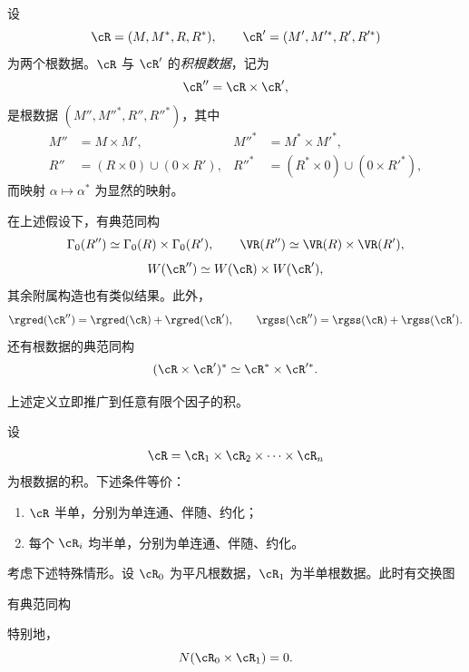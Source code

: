 \begin{definition}\label{sga3:XXI:6.4.1}
设
\[
 \cR=(M,M^\ast,R,R^\ast),
 \qquad
 \cR'=(M',M'^\ast,R',R'^\ast)
\]
为两个根数据。\(\cR\) 与 \(\cR'\) 的\emph{积根数据}，记为
\[
 \cR''=\cR\times\cR',
\]
是根数据 \((M'',M''^\ast,R'',R''^\ast)\)，其中
\[
\begin{aligned}
 M''&=M\times M',
 &M''^\ast&=M^\ast\times M'^\ast,\\
 R''&=(R\times0)\cup(0\times R'),
 &R''^\ast&=(R^\ast\times0)\cup(0\times R'^\ast),
\end{aligned}
\]
而映射 \(\alpha\mapsto\alpha^\ast\) 为显然的映射。
\end{definition}

\begin{proposition}\label{sga3:XXI:6.4.2}
在上述假设下，有典范同构
\[
 \Gamma_0(R'')\simeq\Gamma_0(R)\times\Gamma_0(R'),
 \qquad
 \VR(R'')\simeq\VR(R)\times\VR(R'),
\]
\[
 W(\cR'')\simeq W(\cR)\times W(\cR'),
\]
其余附属构造也有类似结果。此外，
\[
 \rgred(\cR'')=\rgred(\cR)+\rgred(\cR'),
 \qquad
 \rgss(\cR'')=\rgss(\cR)+\rgss(\cR').
\]
还有根数据的典范同构
\[
 (\cR\times\cR')^\ast\simeq\cR^\ast\times\cR'^\ast.
\]
\end{proposition}

上述定义立即推广到任意有限个因子的积。

\begin{proposition}\label{sga3:XXI:6.4.3}
设
\[
 \cR=\cR_1\times\cR_2\times\cdots\times\cR_n
\]
为根数据的积。下述条件等价：
\begin{enumerate}
\item[(i)] \(\cR\) 半单，分别为单连通、伴随、约化；
\item[(ii)] 每个 \(\cR_i\) 均半单，分别为单连通、伴随、约化。
\end{enumerate}
\end{proposition}

考虑下述特殊情形。设 \(\cR_0\) 为平凡根数据，\(\cR_1\) 为半单根数据。此时有交换图
\begin{center}
\end{center}

\begin{lemma}\label{sga3:XXI:6.4.4}
有典范同构
\begin{center}
\end{center}
特别地，
\[
 N(\cR_0\times\cR_1)=0.
\]
\end{lemma}

